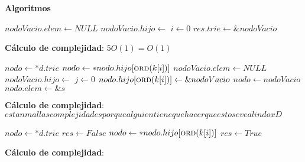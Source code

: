 \documentclass[10pt, a4paper]{article}
\let\TipoVariable=\texttt
\let\ModificadorArgumento=\textbf
\newcommand{\In}[2]{\ModificadorArgumento{in} \ensuremath{#1}\,: \TipoVariable{#2}\xspace}
\newcommand{\Inout}[2]{\ModificadorArgumento{in/out} \ensuremath{#1}\,: \TipoVariable{#2}\xspace}
\newenvironment{Servicios Usados}{%
  \vspace*{2ex}
  \noindent\textbf{\Large Servicios Usados}%
  \vspace*{2ex}
}{}
\newenvironment{Algoritmos}{%
  \vspace*{2ex}%
  \noindent\textbf{\Large Algoritmos}%
  \vspace*{2ex}%
}{}
\newenvironment{Algoritmos Del Iterador}{%
  \vspace*{2ex}%
  \noindent\textbf{\Large Algoritmos Del Iterador}%
  \vspace*{2ex}%
}{}
\newcommand{\DRef}{\ensuremath{\rightarrow}}
\begin{document}
\begin{Algoritmos}

\begin{algorithm}[H]
\caption*{iVacio() $\DRef res$ : \TipoVariable{diccTrie($\alpha$)}}
\begin{algorithmic}[1]
	\State $nodoVacio.elem \gets NULL$ 
	\State $nodoVacio.hijo \gets$  
	\State $i \gets 0$
    	\State {}
	\EndWhile
	\State $res.trie \gets \&nodoVacio$ 
\end{algorithmic}
\textbf{C\'alculo de complejidad}: $5O(1) = O(1)$
\end{algorithm}

\begin{algorithm}[H]
\caption*{iDefinir(\Inout{d}{diccTrie($\alpha$)}, \In {k}{string}, \In{s}{$\alpha$)}}
\begin{algorithmic}[1]
	\State $nodo \gets *d.trie$
			\State $nodo \gets *nodo.hijo[\Call{ord}{k[i]}]$
		\Else
			\State $nodoVacio.elem \gets NULL$ 
			\State $nodoVacio.hijo \gets$  
			\State $j \gets 0$
    			\State {}
			\EndWhile
			\State $nodo.hijo[\Call{ord}{k[i]}] \gets \&nodoVacio$
			\State $nodo \gets nodoVacio$ 
		\EndIf
	\EndFor
	\State $nodo.elem \gets \&s$ 	
\end{algorithmic}
\textbf{C\'alculo de complejidad}: $estan mal las complejidades porque alguien tiene que hacer que esto se vea lindo xD$
\end{algorithm}

\begin{algorithm}[H]
\caption*{iDefinido?(\Inout{d}{diccTrie($\alpha$)}, \In{k}{string} $\DRef res$ : \TipoVariable{Bool}}
\begin{algorithmic}[1]
	\State $nodo \gets *d.trie$
			\State $res \gets False$
		\Else
			\State $nodo \gets *nodo.hijo[\Call{ord}{k[i]}]$
		\EndIf
	\EndFor
	\State $res \gets True$
\end{algorithmic}
\textbf{C\'alculo de complejidad}: 
\end{algorithm}


\end{Algoritmos}
\end{document}
